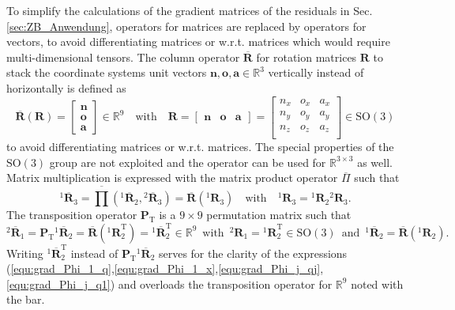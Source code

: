 \documentclass[robotics,article,submit,moreauthors,pdftex]{Definitions/mdpi}
\newcommand{\bm}[1]{\boldsymbol{#1}}
\newcommand{\rotmat}[2]{{{ }^{#1}\boldsymbol{R}}_{#2}}
\newcommand{\rotmato}[2]{{{ }^{#1}\boldsymbol{\overline{R}}}_{#2}}
\newcommand{\transp}[0]{{\mathrm{T}}}
\begin{document}
To simplify the calculations of the gradient matrices of the residuals in Sec.\,\ref{sec:ZB_Anwendung}, operators for matrices are replaced by operators for vectors, to avoid differentiating matrices or w.r.t. matrices which would require multi-dimensional tensors.
The column operator $\overline{\bm{R}}$ for rotation matrices $\bm{R}$ to stack the coordinate systems unit vectors $\bm{n},\bm{o},\bm{a} \in {\mathbb{R}}^{3}$ vertically instead of horizontally is defined as
%
\begin{equation}
\overline{\bm{R}}(\bm{R})=\begin{bmatrix}
\bm{n} \\ \bm{o} \\ \bm{a}
\end{bmatrix} \in {\mathbb{R}}^{9}
\quad
\mathrm{with}
\quad
\bm{R}=\begin{bmatrix}
\bm{n} & \bm{o} & \bm{a}
\end{bmatrix}
=
\begin{bmatrix}
{n_x}&{o_x}&{a_x} \\
{n_y}&{o_y}&{a_y} \\ 
{n_z}&{o_z}&{a_z} \\ 
\end{bmatrix}
\in \mathrm{SO}(3)
\label{equ:def_rotmat}
\end{equation}
%
to avoid differentiating matrices or w.r.t. matrices.
The special properties of the $\mathrm{SO}(3)$ group are not exploited and the operator can be used for ${\mathbb{R}}^{3\times3}$ as well.
Matrix multiplication is expressed with the matrix product operator $\overline{\Pi}$
%
such that
%
\begin{equation}
\rotmato{1}{3}
=
\overline{\prod}\left( \rotmato{1}{2}, \rotmato{2}{3}\right)
=
\overline{\bm{R}}(\rotmat{1}{3})
\quad
\mathrm{with}
\quad
\rotmat{1}{3}
=
\rotmat{1}{2}
\rotmat{2}{3}.
\label{equ:matprod}
\end{equation}
%
The transposition operator $\bm{P}_\transp$ is a $9 \times 9$ permutation matrix such that
%
\begin{equation}
\rotmato{2}{1}
=
\bm{P}_\transp \rotmato{1}{2}
=
\overline{\bm{R}}(\rotmat{1}{2}^\transp)
=
\rotmato{1}{2}^\transp
\in {\mathbb{R}}^{9}
\enspace
\mathrm{with}
\enspace
\rotmat{2}{1}
=
\rotmat{1}{2}^\transp
\in \mathrm{SO}(3)
\enspace
\mathrm{and}
\enspace
\rotmato{1}{2}=\overline{\bm{R}}(\rotmat{1}{2})
.
\label{equ:transposition_operator}
\end{equation}
%
Writing $\rotmato{1}{2}^\transp$ instead of $\bm{P}_\transp \rotmato{1}{2}$ serves for the clarity of the expressions (\ref{equ:grad_Phi_1_q},\ref{equ:grad_Phi_1_x},\ref{equ:grad_Phi_j_qj},\ref{equ:grad_Phi_j_q1}) and overloads the transposition operator for ${\mathbb{R}}^{9}$ noted with the bar.
\end{document}

